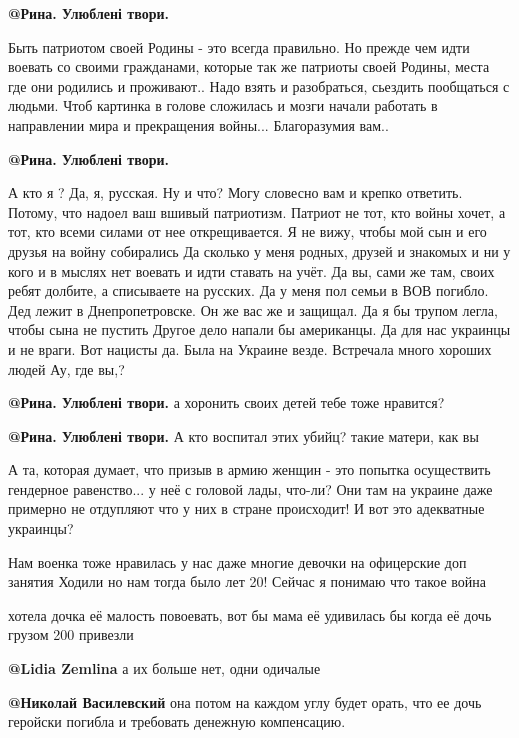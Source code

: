\begin{itemize}
\textbf{@Рина. Улюблені твори.}  

Быть патриотом своей Родины - это всегда правильно. Но прежде чем идти воевать
со своими гражданами, которые так же патриоты своей Родины, места где они
родились и проживают.. Надо взять и разобраться, сьездить пообщаться с людьми.
Чтоб картинка в голове сложилась и мозги начали работать в направлении мира и
прекращения войны...  Благоразумия вам.. 

\textbf{@Рина. Улюблені твори.}  

А кто я ? Да, я, русская. Ну и что? Могу словесно вам и
крепко ответить. Потому, что надоел ваш вшивый патриотизм. Патриот не тот, кто
войны хочет, а тот, кто всеми силами от нее открещивается. Я не вижу, чтобы мой
сын и его друзья на войну собирались Да сколько у меня родных, друзей и
знакомых и ни у кого и в мыслях нет воевать и идти ставать на учёт. Да вы, сами
же там, своих ребят долбите, а списываете на русских. Да у меня пол семьи в ВОВ
погибло. Дед лежит в Днепропетровске. Он же вас же и защищал. Да я бы трупом
легла, чтобы сына не пустить Другое дело напали бы американцы. Да для нас
украинцы и не враги. Вот нацисты да. Была на Украине везде. Встречала много
хороших людей Ау, где вы,?

\textbf{@Рина. Улюблені твори.}  а хоронить своих детей тебе тоже нравится? 

\textbf{@Рина. Улюблені твори.}  А кто воспитал этих убийц? такие матери, как вы


А та, которая думает, что призыв в армию женщин - это попытка осуществить
гендерное равенство... у неё с головой лады, что-ли? Они там на украине даже
примерно не отдупляют что у них в стране происходит! И вот это адекватные
украинцы?


Нам военка тоже нравилась у нас даже многие девочки на офицерские доп занятия
Ходили но нам тогда было лет 20! Сейчас я понимаю что такое война


хотела дочка её малость повоевать, вот бы мама её удивилась бы когда её дочь
грузом 200 привезли

 \textbf{@Lidia Zemlina}  а их больше нет, одни одичалые

\textbf{@Николай Василевский}  она  потом на каждом углу будет орать, что ее
дочь геройски погибла и требовать денежную компенсацию. 


\end{itemize}
